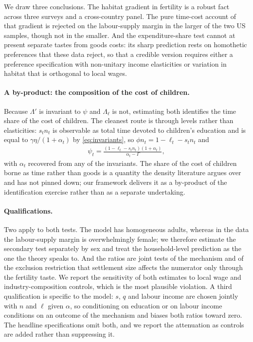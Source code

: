 \documentclass[11pt]{article}
\begin{document}
We draw three conclusions. The habitat gradient in fertility is a robust fact across three surveys
and a cross-country panel. The pure time-cost account of that gradient is rejected on the
labour-supply margin in the larger of the two US samples, though not in the smaller. And the
expenditure-share test cannot at present separate tastes from goods costs: its sharp prediction
rests on homothetic preferences that these data reject, so that a credible version requires either
a preference specification with non-unitary income elasticities or variation in habitat that is
orthogonal to local wages.

\paragraph{A by-product: the composition of the cost of children.}
Because $\Lambda'$ is invariant to $\psi$ and $\Lambda_\ell$ is not, estimating both identifies the
time share of the cost of children. The cleanest route is through levels rather than elasticities:
$s_tn_t$ is observable as total time devoted to children's education and is equal to
$\gamma\eta/(1+\alpha_t)$ by \eqref{eq:invariants}, so $\phi n_t=1-\ell_t-s_tn_t$ and
\begin{align}
\psi_t=\frac{\left(1-\ell_t-s_tn_t\right)\left(1+\alpha_t\right)}{\alpha_t-\Gamma},
\label{eq:psi_identified}
\end{align}
with $\alpha_t$ recovered from any of the invariants. The share of the cost of children borne as
time rather than goods is a quantity the density literature argues over and has not pinned down;
our framework delivers it as a by-product of the identification exercise rather than as a separate
undertaking.

\paragraph{Qualifications.}
Two apply to both tests. The model has homogeneous adults, whereas in the data the labour-supply
margin is overwhelmingly female; we therefore estimate the secondary test separately by sex and
treat the household-level prediction as the one the theory speaks to. And the ratios are joint
tests of the mechanism and of the exclusion restriction that settlement size affects the numerator
only through the fertility taste. We report the sensitivity of both estimates to local wage and
industry-composition controls, which is the most plausible violation. A third qualification is
specific to the model: $s$, $q$ and labour income are chosen jointly with $n$ and $\ell$ given
$\alpha$, so conditioning on education or on labour income conditions on an outcome of the
mechanism and biases both ratios toward zero. The headline specifications omit both, and we report
the attenuation as controls are added rather than suppressing it.
\end{document}
